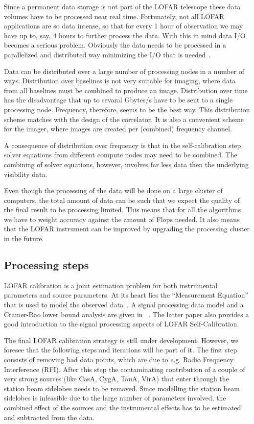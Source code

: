 \documentclass[journal]{IEEEtran}
\begin{document}
Since a permanent data storage is not part of the LOFAR telescope these data volumes have to be processed near real time. Fortunately, not all LOFAR applications are so data intense, so that for every 1 hour of observation we may have up to, say, 4 hours to further process the data. With this in mind data I/O becomes a serious problem. Obviously the data needs to be processed in a parallelized and distributed way minimizing the I/O that is needed~\cite{Loose:08,Diepen:08}.  
 
Data can be distributed over a large number of processing nodes in a number of ways. Distribution over baselines is not very suitable for imaging, where data from all baselines must be combined to produce an image. Distribution over time has the disadvantage that up to sevaral Gbytes/s have to be sent to a single processing node. Frequency, therefore, seems to be the best way. This distribution scheme matches with the design of the correlator. It is also a convenient scheme for the imager, where images are created per (combined) frequency channel. 

A consequence of distribution over frequency is that in the self-calibration step solver equations from different compute nodes may need to be combined. The combining of solver equations, however, involves far less data then the underlying visibility data.   

Even though the processing of the data will be done on a large cluster of computers, the total amount of data can be such that we expect the quality of the final result to be processing limited. This means that for all the algorithms we have to weight accuracy against the amount of Flops needed. It also means that the LOFAR instrument can be improved by upgrading the processing cluster in the future. 

\subsection{Processing steps}

LOFAR calibration is a joint estimation problem for both instrumental parameters and source parameters. At its heart lies the ``Measurement Equation'' that is used to model the observed data~\cite{Hamaker:96}. A signal processing data model and a Cramer-Rao lower bound analysis are given in ~\cite{Tol:07}. The latter paper also provides a good introduction to the signal processing aspects of LOFAR Self-Calibration.   

The final LOFAR calibration strategy is still under development. However, we foresee that the following steps and iterations will be part of it. The first step consists of removing bad data points, which are due to e.g. Radio Frequency Interference (RFI). After this step the contaminating contribution of a couple of very strong sources (like CasA, CygA, TauA, VirA) that enter through the station beam sidelobes needs to be removed. Since modelling the station beam sidelobes is infeasible due to the large number of parameters involved, the combined effect of the sources and the instrumental effects has to be estimated and subtracted from the data. 
\end{document}
